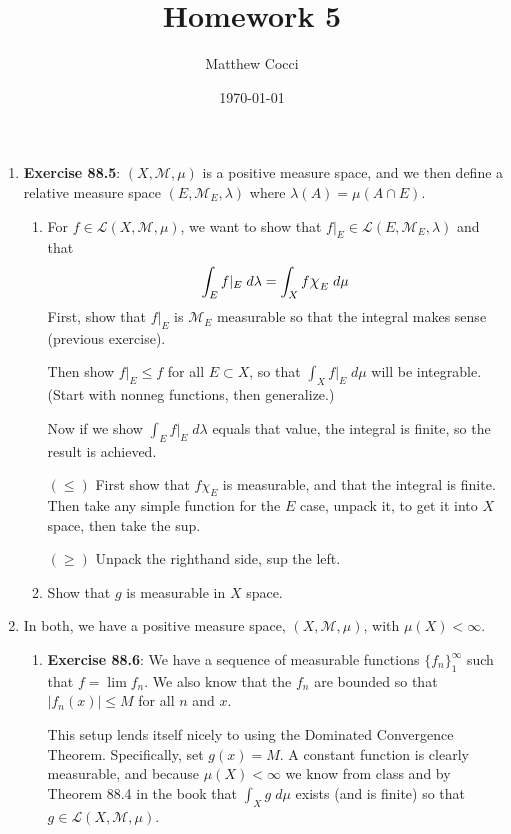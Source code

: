 \documentclass[12pt]{article}
\author{Matthew Cocci}
\title{\textbf{Homework 5}}
\date{\today}
\theoremstyle{plain}
\theoremstyle{definition}
\theoremstyle{remark}
\newcommand*{\Chi}{\mbox{\large$\chi$}} %
\begin{document}
\maketitle 

\begin{enumerate} 

\item \textbf{Exercise 88.5}: $(X,\mathscr{M},\mu)$ is a positive measure space, and we then define a relative measure space $(E,\mathscr{M}_E,\lambda)$ where $\lambda(A)=\mu(A\cap E)$.

\begin{enumerate}
\item For $f\in\mathscr{L}(X,\mathscr{M},\mu)$, we want to show that $f|_E \in\mathscr{L}(E,\mathscr{M}_E,\lambda)$ and that
\[
    \int_E f|_E \; d\lambda = \int_X f \Chi_E\; d\mu
\]
First, show that $f|_E$ is $\mathscr{M}_E$ measurable so that the integral makes sense (previous exercise).

Then show $f|_E \leq f$ for all $E\subset X$, so that $\int_X f|_E \; d\mu$ will be integrable. (Start with nonneg functions, then generalize.) 

Now if we show $\int_E f|_E \; d\lambda$ equals that value, the integral is finite, so the result is achieved.

$(\leq)$ First show that $f\chi_E$ is measurable, and that the integral is finite. Then take any simple function for the $E$ case, unpack it, to get it into $X$ space, then take the sup.

$(\geq)$ Unpack the righthand side, sup the left.

\item Show that $g$ is measurable in $X$ space.  

\end{enumerate}

\item In both, we have a positive measure space, $(X,\mathscr{M},\mu)$, with $\mu(X)<\infty$.

\begin{enumerate} 

\item \textbf{Exercise 88.6}: We have a sequence of measurable functions $\{f_n\}_1^\infty$ such that $f=\lim f_n$. We also know that the $f_n$ are bounded so that $|f_n(x)|\leq M$ for all $n$ and $x$. 

This setup lends itself nicely to using the Dominated Convergence Theorem.  Specifically, set $g(x)=M$. A constant function is clearly measurable, and because $\mu(X)<\infty$ we know from class and by Theorem 88.4 in the book that $\int_X g \; d\mu$ exists (and is finite) so that $g\in\mathscr{L}(X,\mathscr{M},\mu)$.


\end{enumerate}
\end{enumerate}
\end{document}
